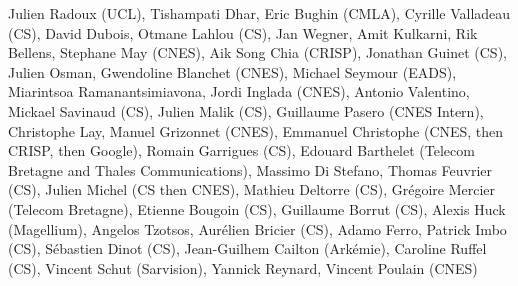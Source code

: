 Julien Radoux (UCL), Tishampati Dhar, Eric Bughin (CMLA), Cyrille Valladeau (CS), David Dubois, Otmane Lahlou (CS), Jan Wegner, Amit Kulkarni, Rik Bellens, Stephane May (CNES), Aik Song Chia (CRISP), Jonathan Guinet (CS), Julien Osman, Gwendoline Blanchet (CNES), Michael Seymour (EADS), Miarintsoa Ramanantsimiavona, Jordi Inglada (CNES), Antonio Valentino, Mickael Savinaud (CS), Julien Malik (CS), Guillaume Pasero (CNES Intern), Christophe Lay, Manuel Grizonnet (CNES), Emmanuel Christophe (CNES, then CRISP, then Google), Romain Garrigues (CS), Edouard Barthelet (Telecom Bretagne and Thales Communications), Massimo Di Stefano, Thomas Feuvrier (CS), Julien Michel (CS then CNES), Mathieu Deltorre (CS), Gr\'egoire Mercier (Telecom Bretagne), Etienne Bougoin (CS), Guillaume Borrut (CS), Alexis Huck (Magellium), Angelos Tzotsos, Aur\'elien Bricier (CS), Adamo Ferro, Patrick Imbo (CS), S\'ebastien Dinot (CS), Jean-Guilhem Cailton (Ark\'emie), Caroline Ruffel (CS), Vincent Schut (Sarvision), Yannick Reynard, Vincent Poulain (CNES)